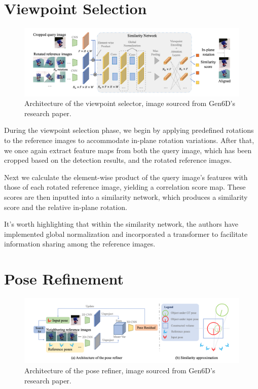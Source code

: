 
\section{Viewpoint Selection}

\begin{figure}[ht]
  \centering
  \includegraphics[width=\textwidth]{data/gen6d3.png}
  \caption{Architecture of the viewpoint selector, image sourced from Gen6D's \\ research paper.}
  \label{fig:fig2}
\end{figure}

\bigskip

During the viewpoint selection phase, we begin by applying predefined rotations to the reference images to accommodate in-plane rotation variations. After that, we once again extract feature maps from both the query image, which has been cropped based on the detection results, and the rotated reference images.

Next we calculate the element-wise product of the query image's features with those of each rotated reference image, yielding a correlation score map. These scores are then inputted into a similarity network, which produces a similarity score and the relative in-plane rotation.

It's worth highlighting that within the similarity network, the authors have implemented global normalization and incorporated a transformer to facilitate information sharing among the reference images.



\section{Pose Refinement}

\begin{figure}[ht]
  \centering
  \includegraphics[width=\textwidth]{data/gen6d4.png}
  \caption{Architecture of the pose refiner, image sourced from Gen6D's research paper.}
  \label{fig:fig3}
\end{figure}

